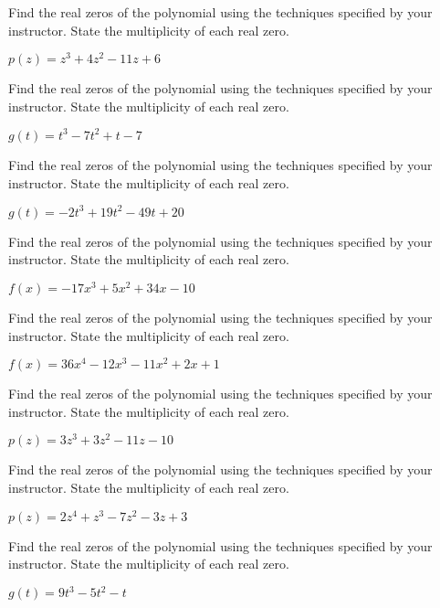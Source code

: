 \documentclass{ximera}
\begin{document}
\begin{problem}
Find the real zeros of the polynomial using the techniques specified by your instructor.  State the multiplicity of each real zero.

$p(z) = z^{3} + 4z^{2} - 11z + 6$
\end{problem}

\begin{problem}
Find the real zeros of the polynomial using the techniques specified by your instructor.  State the multiplicity of each real zero.

$g(t) = t^{3} - 7t^{2} + t - 7$
\end{problem}

\begin{problem}
Find the real zeros of the polynomial using the techniques specified by your instructor.  State the multiplicity of each real zero.

$g(t) = -2t^{3} + 19t^{2} - 49t + 20$
\end{problem}

\begin{problem}
Find the real zeros of the polynomial using the techniques specified by your instructor.  State the multiplicity of each real zero.

$f(x) = -17x^{3} + 5x^{2} + 34x - 10$
\end{problem}

\begin{problem}
Find the real zeros of the polynomial using the techniques specified by your instructor.  State the multiplicity of each real zero.

$f(x) = 36x^{4} - 12x^{3} - 11x^{2} + 2x + 1$
\end{problem}

\begin{problem}
Find the real zeros of the polynomial using the techniques specified by your instructor.  State the multiplicity of each real zero.

$p(z) = 3z^{3} + 3z^{2} - 11z - 10$
\end{problem}

\begin{problem}
Find the real zeros of the polynomial using the techniques specified by your instructor.  State the multiplicity of each real zero.

$p(z) = 2z^4+z^3-7z^2-3z+3$
\end{problem}

\begin{problem}
Find the real zeros of the polynomial using the techniques specified by your instructor.  State the multiplicity of each real zero.

$g(t) = 9t^{3} - 5t^{2} - t$
\end{problem}
\end{document}
